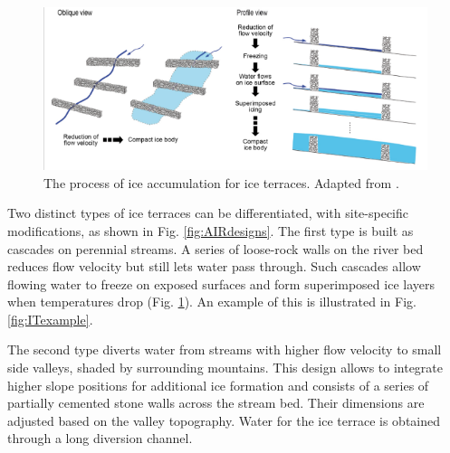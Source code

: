 \begin{figure}[htb]
	\centering
	\includegraphics[width=\textwidth]{figs/IT_science.png}

	\caption{ The process of ice accumulation for ice terraces. Adapted from
		\citet{nusserSociohydrologyArtificialGlaciers2019}.}

	\label{fig:ITscience}
\end{figure}

Two distinct types of ice terraces can be differentiated, with site-specific modifications, as shown in Fig.
\ref{fig:AIRdesigns}. The first type is built as cascades on perennial streams. A series of loose-rock walls on
the river bed reduces flow velocity but still lets water pass through. Such cascades allow flowing water to
freeze on exposed surfaces and form superimposed ice layers when temperatures drop (Fig.
\ref{fig:ITscience}). An example of this is illustrated in Fig. \ref{fig:ITexample}.

The second type diverts water from streams with higher flow velocity to small side valleys, shaded by
surrounding mountains. This design allows to integrate higher slope positions for additional ice formation and
consists of a series of partially cemented stone walls across the stream bed. Their dimensions are adjusted
based on the valley topography. Water for the ice terrace is obtained through a long diversion channel.


